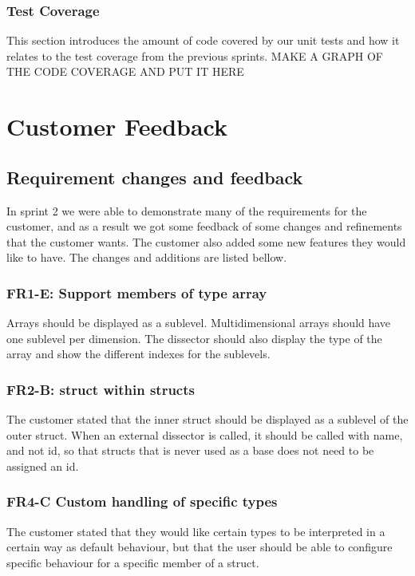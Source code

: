 \subsubsection{Test Coverage}
This section introduces the amount of code covered by our unit tests and how it relates to the test coverage from the previous sprints.
 MAKE A GRAPH OF THE CODE COVERAGE AND PUT IT HERE

 


\section{Customer Feedback}
\subsection{Requirement changes and feedback}
In sprint 2 we were able to demonstrate many of the requirements for the customer, and as a result we got some feedback of some changes and refinements that the customer wants. The customer also added some new features they would like to have. The changes and additions are listed bellow.

\subsubsection{FR1-E: Support members of type array}
Arrays should be displayed as a sublevel. Multidimensional arrays should have one sublevel per dimension. The dissector should also display the type of the array and show the different indexes for the sublevels.

\subsubsection{FR2-B: struct within structs}
The customer stated that the inner struct should be displayed as a sublevel of the outer struct.
When an external dissector is called, it should be called with name, and not id, so that structs that is never used as a base does not need to be assigned an id.

\subsubsection{FR4-C Custom handling of specific types}
The customer stated that they would like certain types to be interpreted in a certain way as default behaviour, but that the user should be able to configure specific behaviour for a specific member of a struct.

